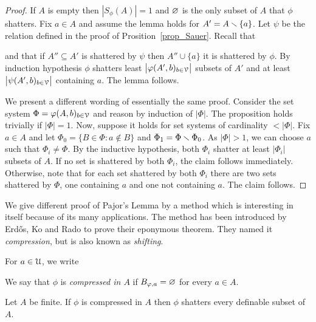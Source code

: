 \documentclass[sputnik.tex]{subfiles}
\begin{document}
\begin{proof}
If $A$ is empty then $|S_\phi(A)|=1$ and $\varnothing$ is the only subset of $A$ that $\phi$ shatters.
Fix $a\in A$ and assume the lemma holds for $A'=A\smallsetminus\{a\}$.
Let $\psi$ be the relation defined in the proof of Prosition~\ref{prop_Sauer}.
Recall that


and that if $A''\subseteq A'$ is shattered by $\psi$ then $A''\cup\{a\}$ it is shattered by $\phi$.
By induction hypothesis $\phi$ shatters least $\big|\varphi(A',b)_{b\in\EuScript V}\big|$ subsets of $A'$ and at least $\big|\psi(A',b)_{b\in\EuScript V}\big|$ containing $a$.
The lemma follows.

We present a different wording of essentially the same proof.
Consider the set system $\Phi=\varphi(A,b)_{b\in\EuScript V}$ and reason by induction of $|\Phi|$.
The proposition holds trivially if $|\Phi|=1$.
Now, suppose it holds for set systems of cardinality $<|\Phi|$.
Fix $a\in A$ and let $\Phi_0=\big\{B\in\Phi : a\notin B\big\}$ and $\Phi_1=\Phi\smallsetminus\Phi_0$.
As $|\Phi|>1$, we can choose $a$ such that $\Phi_i\neq\Phi$.
By the inductive hypothesis, both $\Phi_i$ shatter at least $\big|\Phi_i\big|$ subsets of $A$.
If no set is shattered by both $\Phi_i$, the claim follows immediately.
Otherwise, note that for each set shattered by both $\Phi_i$ there are two sets shattered by $\Phi$, one containing $a$ and one not containing $a$.
The claim follows.
\end{proof}
 
We give different proof of Pajor's Lemma by a method which is interesting in itself because of its many applications.
The method has been introduced by Erd\H{o}s, Ko and Rado to prove their eponymous theorem.
They named it \textit{compression}, but is also known as \textit{shifting}.


For $a\in\EuScript U$, we write 




We say that $\phi$ is \emph{compressed in $A$\/} if $B_{\varphi,a}=\varnothing$ for every $a\in A$.

\begin{proposition}\label{prop_compressed} 
Let $A$ be finite. If $\phi$ is compressed in $A$ then $\phi$ shatters every definable subset of $A$.
\end{proposition}
\end{document}
